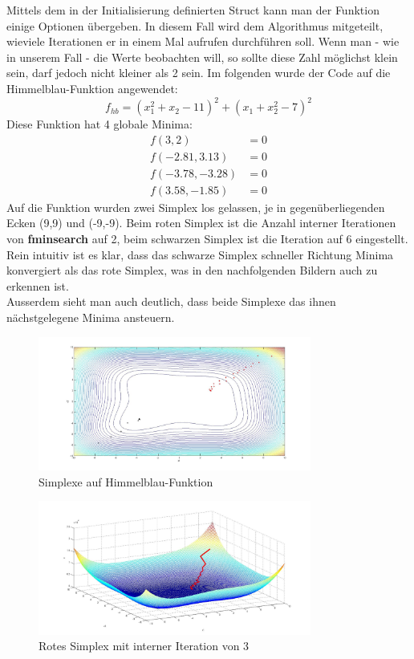 Mittels dem in der Initialisierung definierten Struct kann man der Funktion einige Optionen übergeben. 
In diesem Fall wird dem Algorithmus mitgeteilt, wieviele Iterationen er in einem Mal aufrufen durchführen soll. 
Wenn man - wie in unserem Fall - die Werte beobachten will, so sollte diese Zahl möglichst klein sein, darf jedoch nicht kleiner als 2 sein. 
Im folgenden wurde der Code auf die Himmelblau-Funktion angewendet: 
\begin{equation}
	f_{hb} = (x_1^2 + x_2 -11)^2 + (x_1+x_2^2-7)^2
\end{equation}
Diese Funktion hat 4 globale Minima: 
\begin{subequations}
	\begin{align}
		f(3,2) &= 0 \\
		f(-2.81,3.13) &= 0\\
		f(-3.78,-3.28) &= 0\\
		f(3.58,-1.85) &= 0
	\end{align}
\end{subequations}
Auf die Funktion wurden zwei Simplex los gelassen, je in gegenüberliegenden Ecken (9,9) und (-9,-9). Beim roten Simplex ist die Anzahl interner Iterationen von \textbf{fminsearch} auf 2, beim schwarzen Simplex ist die Iteration auf 6 eingestellt.\\
Rein intuitiv ist es klar, dass das schwarze Simplex schneller Richtung Minima konvergiert als das rote Simplex, was in den nachfolgenden Bildern auch zu erkennen ist. \\
Ausserdem sieht man auch deutlich, dass beide Simplexe das ihnen nächstgelegene Minima ansteuern. 
\begin{figure}[h]
	\centering
	\includegraphics[width=0.8\textwidth]{../bilder/HimmelblauHoehen.jpg}%
  	\caption{Simplexe auf Himmelblau-Funktion}%
	\label{fig:HB1}%
\end{figure}
\newpage
\begin{figure}[h]
	\centering
	\includegraphics[width=0.8\textwidth]{../bilder/Himmelblau3DRot.jpg}%
  	\caption{Rotes Simplex mit interner Iteration von 3}%
	\label{fig:HB2}%
\end{figure}
